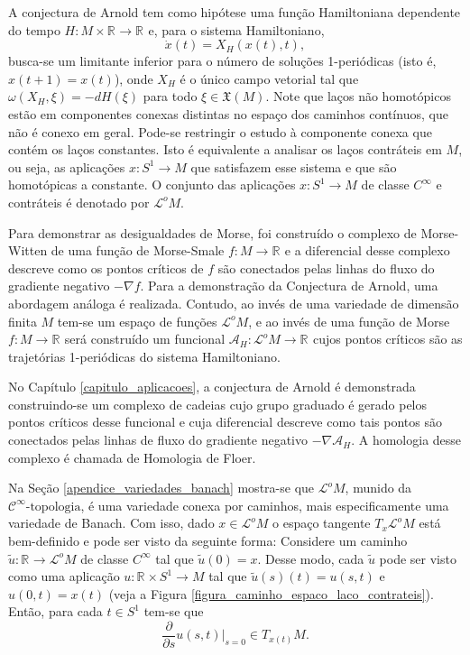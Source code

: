 \documentclass[12pt]{book}
\newcommand{\campohamiltonianoabrev}{X_{H}}
\newcommand{\campossuaves}[1]{\mathfrak{X}(#1)}
\newcommand{\circulo}{S^{1}}
\newcommand{\cktopologia}[1]{\mathcal{C}^{#1}\text{-topologia}}
\newcommand{\derivadaparcial}[2]{\frac{\partial #1}{\partial #2}}
\newcommand{\espacotangenteponto}[2]{T_{#1}#2}
\newcommand{\formaSimpletica}[2]{\omega(#1, #2)}
\newcommand{\funcionalH}{\mathcal{A}_{H}}
\newcommand{\gradiente}{\nabla f}
\newcommand{\gradientefuncional}{\nabla \funcionalH}
\newcommand{\retacartesianocirculo}{\real{} \times \circulo}
\newcommand{\real}[1]{\mathbb{R}^{#1}}
\newcommand{\reta}{\real{}}
\newcommand{\lacocontrateis}{\mathcal{L}^{o}M}
\begin{document}
	A conjectura de Arnold tem como hipótese uma função Hamiltoniana dependente do tempo $H: M\times \reta \to \reta$ e, para o sistema Hamiltoniano,
	$$
	\dot{x}(t) = X_{H}(x(t), t),
	$$
	busca-se um limitante inferior para o número de soluções 1-periódicas (isto é, $x(t+1)=x(t)$), onde $\campohamiltonianoabrev$ é o único campo vetorial tal que $\formaSimpletica{\campohamiltonianoabrev}{\xi} = -dH(\xi)$ para todo $\xi \in \campossuaves{M}$. Note que laços não homotópicos estão em componentes conexas distintas no espaço dos caminhos contínuos, que não é conexo em geral. Pode-se restringir o estudo à componente conexa que contém os laços constantes. Isto é equivalente a analisar os laços contráteis em $M$, ou seja, as aplicações $x : \circulo\to M$ que satisfazem esse sistema e que são homotópicas a constante. O conjunto das aplicações $x:\circulo \to M$ de classe $C^{\infty}$ e contráteis é denotado por $\lacocontrateis$.
	
	Para demonstrar as desigualdades de Morse, foi construído o complexo de Morse-Witten de uma função de Morse-Smale $f: M\to \reta$ e a diferencial desse complexo descreve como os pontos críticos de $f$ são conectados pelas linhas do fluxo do gradiente negativo $-\gradiente$. Para a demonstração da Conjectura de Arnold, uma abordagem análoga é realizada. Contudo, ao invés de uma variedade de dimensão finita $M$ tem-se um espaço de funções $\lacocontrateis$, e ao invés de uma função de Morse $f:M\to \reta$ será construído um funcional $\funcionalH:\lacocontrateis\to \reta$ cujos pontos críticos são as trajetórias 1-periódicas do sistema Hamiltoniano.
	
	No Capítulo \ref{capitulo_aplicacoes}, a conjectura de Arnold é demonstrada construindo-se um complexo de cadeias cujo grupo graduado é gerado pelos pontos críticos desse funcional e cuja diferencial descreve como tais pontos são conectados pelas linhas de fluxo do gradiente negativo $-\gradientefuncional$. A homologia desse complexo é chamada de Homologia de Floer.
	
	Na Seção \ref{apendice_variedades_banach} mostra-se que $\lacocontrateis$, munido da $\cktopologia{\infty}$, é uma variedade conexa por caminhos, mais especificamente uma variedade de Banach. Com isso, dado $x\in \lacocontrateis$ o espaço tangente $\espacotangenteponto{x}{\lacocontrateis}$ está bem-definido e pode ser visto da seguinte forma: Considere um caminho $\tilde{u}:\reta\to \lacocontrateis$ de classe $C^{\infty}$ tal que $\tilde{u}(0)=x$. Desse modo, cada $\tilde{u}$ pode ser visto como uma aplicação $u: \retacartesianocirculo \to M$ tal que $\tilde{u}(s)(t) = u(s,t)$ e $u(0,t) = x(t)$ (veja a Figura \ref{figura_caminho_espaco_laco_contrateis}). Então, para cada $t\in \circulo$ tem-se que
	$$
	\derivadaparcial{}{s}u(s,t)|_{s=0} \in \espacotangenteponto{x(t)}{M}.
	$$
	
\end{document}
